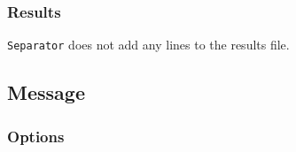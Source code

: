 \documentclass[11pt,letterpaper]{article}
\begin{document}
\normalsize

\subsubsection*{Results}

\texttt{Separator} does not add any lines to the results file.

\subsection{Message}

\subsubsection*{Options}
\end{document}
